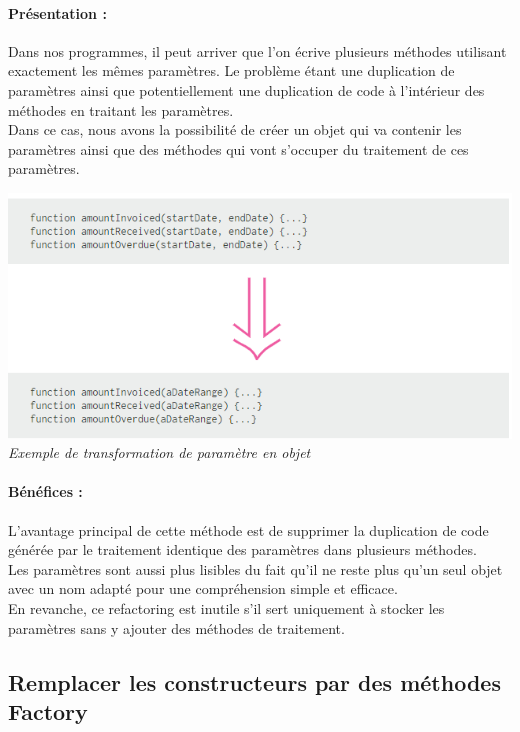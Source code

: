 \documentclass[a4paper,twoside,12pt,openright]{report}
\begin{document}
\paragraph{Présentation :}
Dans nos programmes, il peut arriver que l'on écrive plusieurs méthodes utilisant exactement les mêmes paramètres. Le problème étant une duplication de paramètres ainsi que potentiellement une duplication de code à l'intérieur des méthodes en traitant les paramètres.\\
Dans ce cas, nous avons la possibilité de créer un objet qui va contenir les paramètres ainsi que des méthodes qui vont s'occuper du traitement de ces paramètres.\\

\begin{center}
\includegraphics[scale=1]{Image/Ajout_Objet_Parametre.png}\\
\itshape{Exemple de transformation de paramètre en objet \cite{ref8}}
\end{center}

\paragraph{Bénéfices :}
L'avantage principal de cette méthode est de supprimer la duplication de code générée par le traitement identique des paramètres dans plusieurs méthodes.\\
Les paramètres sont aussi plus lisibles du fait qu'il ne reste plus qu'un seul objet avec un nom adapté pour une compréhension simple et efficace.\\
En revanche, ce refactoring est inutile s'il sert uniquement à stocker les paramètres sans y ajouter des méthodes de traitement.\\

\subsection{Remplacer les constructeurs par des méthodes Factory}
\end{document}

